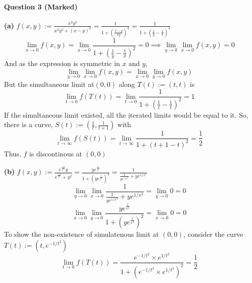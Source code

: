 \documentclass[20pt,a4paper]{extarticle} %
\theoremstyle{definition}
\theoremstyle{definition}
\begin{document}
\paragraph{Question 3 (Marked)}
\textbf{(a)} $f(x,y):=\frac{x^2y^2}{x^2y^2+(x-y)^2}=\frac{1}{1+(\frac{x-y}{xy})^2}=\frac{1}{1+(\frac{1}{y}-\frac{1}{x})^2}$\\
\[ \lim_{x \to 0} f(x,y)=\lim_{x \to 0} \frac{1}{1+(\frac{1}{y}-\frac{1}{x})^2}=0
\implies \lim_{y \to 0}\lim_{x \to 0}f(x,y)=0 \]
And as the expression is symmetric in $x \text{ and } y$,
\[ \lim_{y \to 0}\lim_{x \to 0}f(x,y)=\lim_{x \to 0}\lim_{y \to 0}f(x,y)\]
But the simultaneous limit at$(0,0)$  along $T(t):=(t,t) $ is
\[ \lim_{t \to 0} f(T(t))= \lim_{t \to 0} \frac{1}{1+(\frac{1}{t}-\frac{1}{t})^2}=1 \]
If the simultaneous limit existed, all the iterated limits would be equal to it. So, there is a curve,
$S(t):=(\frac{1}{t},\frac{1}{t+1})$ with
\[ \lim_{t \to \infty} f(S(t)) = \lim_{t \to \infty} \frac{1}{1+(t+1-t)^2}=\frac{1}{2} \]
Thus, $f$ is discontinous at $(0,0)$

\textbf{(b)} $f(x,y):=\frac{e^{\frac{-1}{x^2}}y}{e^{\frac{-1}{x^2}}+y^2}=\frac{ye^{\frac{1}{x^2}}}
{ 1+(ye^{\frac{1}{x^2}})^2}=\frac{1}{ \frac{1}{ye^{1/x^2}}+ye^{1/x^2}} $\\
\[ \lim_{y \to 0} \lim_{x \to 0}\frac{1}{ \frac{1}{ye^{1/x^2}}+ye^{1/x^2}}= \lim_{y \to 0} 0=0  \]
\[ \lim_{x \to 0} \lim_{y \to 0}\frac{ye^{\frac{1}{x^2}}}{ 1+(ye^{\frac{1}{x^2}})^2}=\lim_{x \to 0} 0=0\]
To show the non-existence of simulatenous limit at $(0,0)$, consider the curve $T(t):=(t,e^{-1/t^2})$
\[\lim_{t\to 0}f(T(t))=\frac{e^{-1/t^2}\times e^{1/t^2}}{1+(e^{-1/t^2}\times e^{1/t^2})^2}=\frac{1}{2} \]
\newpage
\end{document}
